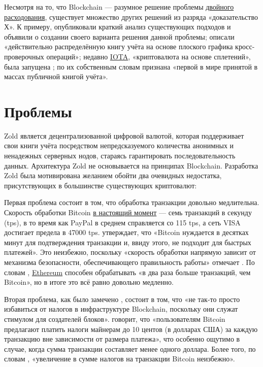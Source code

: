 \documentclass{main}
\begin{document}
Несмотря на то, что Blockchain --- разумное решение проблемы
\href{https://ru.wikipedia.org/wiki/%D0%94%D0%B2%D0%BE%D0%B9%D0%BD%D0%BE%D0%B5_%D1%80%D0%B0%D1%81%D1%85%D0%BE%D0%B4%D0%BE%D0%B2%D0%B0%D0%BD%D0%B8%D0%B5}{двойного расходования},
существует множество других решений из разряда «доказательство Х».
К примеру,  опубликовали краткий анализ существующих подходов и объявили
о создании своего варианта решения данной проблемы;  описали
«действительно распределённую книгу учёта на основе плоского графика
кросс-проверочных операций»; недавно \href{https://www.iota.org/}{IOTA}, «криптовалюта на основе сплетений», была
запущена ;  по их собственным словам
признана «первой в мире принятой в массах публичной
книгой учёта».

\pagebreak

\section*{Проблемы}

Zold является децентрализованной цифровой валютой, которая поддерживает свои
книги учёта посредством непредсказуемого количества анонимных и ненадежных
серверных нодов, стараясь гарантировать последовательность данных. Архитектура
Zold не основывается на принципах Blockchain. Разработка Zold была мотивирована желанием
обойти два очевидных недостатка, присутствующих в большинстве существующих
криптовалют:

Первая проблема состоит в том, что обработка транзакции довольно
медлительна. Скорость обработки Bitcoin
\href{https://goo.gl/sWiAWc}{в настоящий момент} --- семь транзакций в
секунду (tps), в то время как PayPal в среднем справляется со 115 tps, а сеть
VISA достигает предела в 47000 tps.  утверждает, что «Bitcoin
нуждается в десятках минут для подтверждения транзакции и, ввиду этого, не
подходит для быстрых платежей». Это неизбежно, поскольку «скорость обработки
напрямую зависит от механизма безопасности, обеспечивающего правильность работы»
отмечает . По словам ,
\href{https://ethereum.org/}{Ethereum} способен обрабатывать
«в два раза больше транзакций, чем Bitcoin», но в итоге это всё равно довольно
медленно.

Вторая проблема, как было замечено , состоит в том, что «не так-то просто
избавиться от налогов в инфраструктуре Blockchain, поскольку они служат стимулом
для создателей блоков».  говорит, что «пользователям Bitcoin
предлагают платить налоги майнерам до 10 центов (в долларах США) за каждую
транзакцию вне зависимости от размера платежа», что особенно ощутимо в случае,
когда сумма транзакции составляет менее одного доллара. Более того, по словам
, «увеличение в сумме налогов на транзакции Bitcoin неизбежно».
\end{document}
